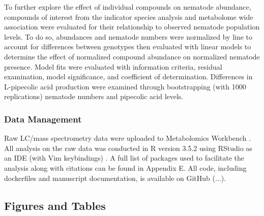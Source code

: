 \documentclass[9pt,lineno]{elife}
\begin{document}
To further explore the effect of individual compounds on nematode abundance, compounds of interest from the indicator species analysis and metabolome wide association were evaluated for their relationship to observed nematode population levels.  To do so, abundances and nematode numbers were normalized by line to account for differences between genotypes then evaluated with linear models to determine the effect of normalized compound abundance on normalized nematode presence. Model fits were evaluated with information criteria, residual examination, model significance, and coefficient of determination.  Differences in L-pipecolic acid production were examined through bootstrapping (with 1000 replications) nematode numbers and pipecolic acid levels.  


\subsubsection{Data Management}

Raw LC/mass spectrometry data were uploaded to Metabolomics Workbench \citep{sud2015metabolomics}.  All analysis on the raw data was conducted in R version 3.5.2 using RStudio as an IDE (with Vim keybindings) \cite{rcore2018,rstudio}.  A full list of packages used to facilitate the analysis along with citations can be found in Appendix E.  All code, including dockerfiles and manuscript documentation, is available on GitHub (...).  



\subsection{Figures and Tables}
\end{document}

